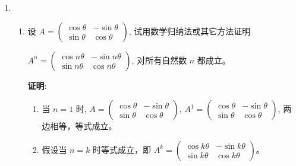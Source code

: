 \documentclass{report}
\newcommand{\proof}{\vspace{0.2cm}\textbf{证明}:}
\begin{document}
\begin{enumerate}
        \item \begin{enumerate}
            \item 设 ${A}=\left(\begin{array}{cc}\cos \theta & -\sin \theta \\ \sin \theta & \cos \theta\end{array}\right)$, 试用数学归纳法或其它方法证明 
            
            ${A}^n=\left(\begin{array}{cc}\cos n \theta & -\sin n \theta \\ \sin n \theta & \cos n \theta\end{array}\right)$, 对所有自然数 $n$ 都成立。

            \proof{}
            \begin{enumerate}[label=(\arabic*)]
                \item 当 $n=1$ 时, ${A}=\left(\begin{array}{cc}\cos \theta & -\sin \theta \\ \sin \theta & \cos \theta\end{array}\right)$, ${A}^1=\left(\begin{array}{cc}\cos \theta & -\sin \theta \\ \sin \theta & \cos \theta\end{array}\right)$, 两边相等，等式成立。
                \item 假设当 $n=k$ 时等式成立，即 ${A}^k=\left(\begin{array}{cc}\cos k \theta & -\sin k \theta \\ \sin k \theta & \cos k \theta\end{array}\right)$。
                

\end{enumerate}
\end{enumerate}
\end{enumerate}
\end{document}
